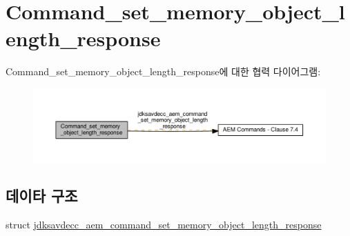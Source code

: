 \hypertarget{group__command__set__memory__object__length__response}{}\section{Command\+\_\+set\+\_\+memory\+\_\+object\+\_\+length\+\_\+response}
\label{group__command__set__memory__object__length__response}
Command\+\_\+set\+\_\+memory\+\_\+object\+\_\+length\+\_\+response에 대한 협력 다이어그램\+:
\nopagebreak
\begin{figure}[H]
\begin{center}
\leavevmode
\includegraphics[width=350pt]{group__command__set__memory__object__length__response}
\end{center}
\end{figure}
\subsection*{데이타 구조}
\begin{DoxyCompactItemize}
\item 
struct \hyperlink{structjdksavdecc__aem__command__set__memory__object__length__response}{jdksavdecc\+\_\+aem\+\_\+command\+\_\+set\+\_\+memory\+\_\+object\+\_\+length\+\_\+response}
\end{DoxyCompactItemize}

